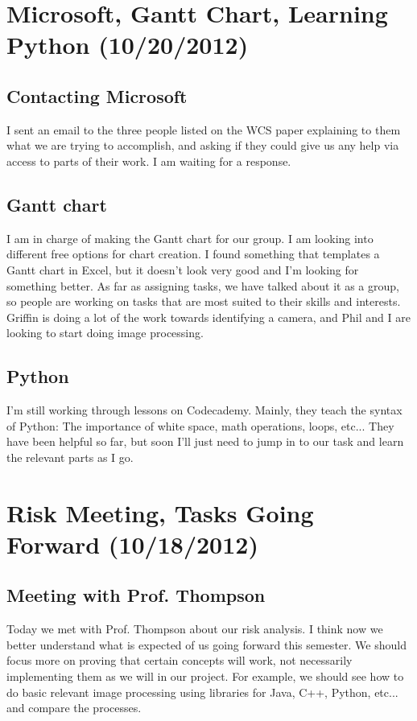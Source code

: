 \documentclass[]{article}
\begin{document}
	\section{Microsoft, Gantt Chart, Learning Python (10/20/2012)}
		\subsection*{Contacting Microsoft}
	I sent an email to the three people listed on the WCS paper explaining to them what we are trying to accomplish, and asking if they could give us any help via access to parts of their work.  I am waiting for a response.
		\subsection*{Gantt chart}	
	I am in charge of making the Gantt chart for our group. I am looking into different free options for chart creation. I found something that templates a Gantt chart in Excel, but it doesn't look very good and I'm looking for something better.  As far as assigning tasks, we have talked about it as a group, so people are working on tasks that are most suited to their skills and interests.  Griffin is doing a lot of the work towards identifying a camera, and Phil and I are looking to start doing image processing.
		\subsection*{Python}
	I'm still working through lessons on Codecademy.  Mainly, they teach the syntax of Python: The importance of white space, math operations, loops, etc...  They have been helpful so far, but soon I'll just need to jump in to our task and learn the relevant parts as I go.  
	\section{Risk Meeting, Tasks Going Forward (10/18/2012)}
		\subsection*{Meeting with Prof. Thompson}
	Today we met with Prof. Thompson about our risk analysis.  I think now we better understand what is expected of us going forward this semester.  We should focus more on proving that certain concepts will work, not necessarily implementing them as we will in our project.  For example, we should see how to do basic relevant image processing using libraries for Java, C++, Python, etc... and compare the processes.  
\end{document}
